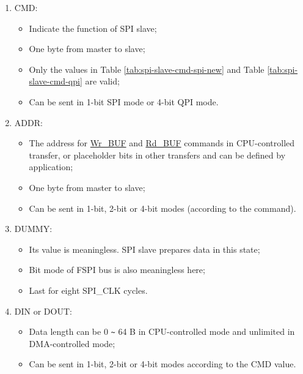 \documentclass[main\_\_EN.tex]{subfiles}
\begin{document}
\begin{enumerate} 
   \item CMD: 
        \begin{itemize}
            \item Indicate the function of SPI slave; 
            \item One byte from master to slave; 
            \item Only the values in Table \ref{tab:spi-slave-cmd-spi-new} and Table \ref{tab:spi-slave-cmd-qpi} are valid;
            \item Can be sent in 1-bit SPI mode or 4-bit QPI mode.
        \end{itemize}
    
   \item ADDR: 
        \begin{itemize}
            \item The address for \hyperlink{cmd:wrbuf}{Wr\_BUF} and \hyperlink{cmd:rdbuf}{Rd\_BUF} commands in CPU-controlled transfer, or placeholder bits in other transfers and can be defined by application;
            \item One byte from master to slave;
            \item Can be sent in 1-bit, 2-bit or 4-bit modes (according to the command).
        \end{itemize}
      
   \item DUMMY: 
        \begin{itemize}
            \item Its value is meaningless. SPI slave prepares data in this state;
            \item Bit mode of FSPI bus is also meaningless here;
            \item Last for eight SPI\_CLK cycles.
        \end{itemize}
   
   \item DIN or DOUT: 

        \begin{itemize}
            \item Data length can be 0 \verb+~+ 64 B in CPU-controlled mode and unlimited in DMA-controlled mode;
            \item Can be sent in 1-bit, 2-bit or 4-bit modes according to the CMD value.
        \end{itemize}
    
   \end{enumerate}
\end{document}
